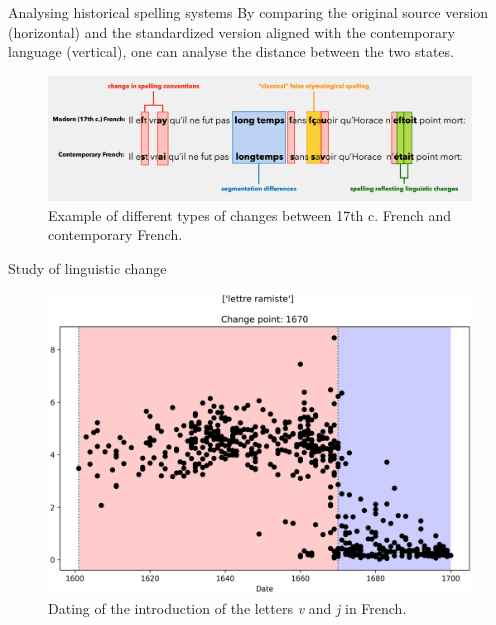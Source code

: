 \documentclass[aspectratio=169]{beamer}
\begin{document}

    \begin{frame}{Analysing historical spelling systems}
        \vspace{1.2em}
        By comparing the original source version (horizontal) and the standardized version aligned with the contemporary language (vertical), one can analyse the distance between the two states.
        \begin{figure}
            \centering
            \includegraphics[width=\linewidth]{nlp-for-ch/images/main-example.pdf}
            \caption{Example of different types of changes between 17th c. French and contemporary French.}
            \label{fig:comparison}
        \end{figure}
    \end{frame}


    \begin{frame}{Study of linguistic change}
        \vspace{1em}
        \begin{figure}
            \centering
            \includegraphics[width=.6\linewidth]{nlp-for-ch/images/3_cptd_ramiste.png}
            \caption{Dating of the introduction of the letters \textit{v} and \textit{j} in French.}
            \label{fig:3_cptd_ramiste}
        \end{figure}
    \end{frame}
\end{document}
